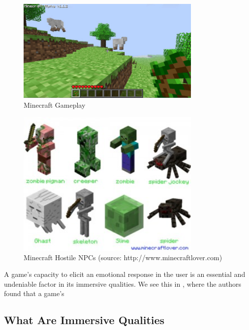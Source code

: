 \begin{figure}[ht!]
\centering
\includegraphics[width=90mm]{minecraft-32.jpg}
\caption{Minecraft Gameplay \label{overflow}}
\label{fig:Minecraft}
\end{figure}
\cite{fig:MCmonster} 
\begin{figure}[ht!]
\centering
\includegraphics[width=90mm]{minecraft-spider-300x240.jpg}
\caption{Minecraft Hostile NPCs (source: http://www.minecraftlover.com) \label{overflow}}
\label{fig:MCmonster}
\end{figure}
A game's capacity to elicit an emotional response in the user is an essential and undeniable factor in its immersive qualities. We see this in \cite{Brown04agrounded}, where the authors found that a game's
\subsection{What Are Immersive Qualities }

